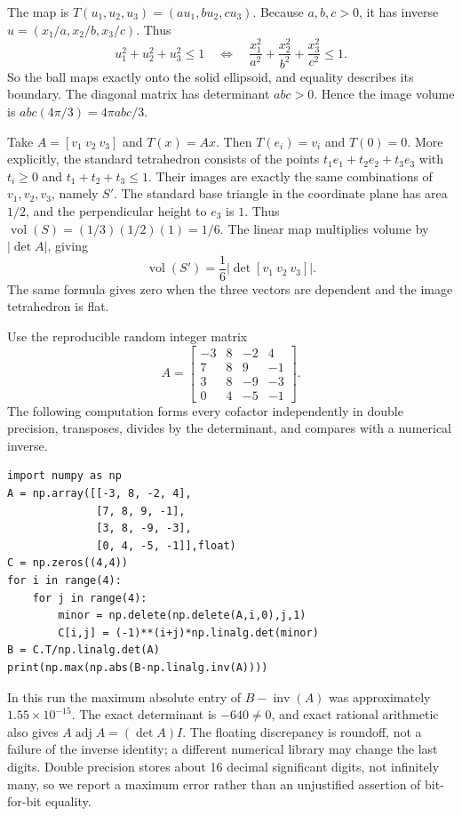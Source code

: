 The map is $T(u_1,u_2,u_3)=(au_1,bu_2,cu_3)$. Because $a,b,c>0$, it has inverse $u=(x_1/a,x_2/b,x_3/c)$. Thus
\[
u_1^2+u_2^2+u_3^2\le1
\quad\Longleftrightarrow\quad
\frac{x_1^2}{a^2}+\frac{x_2^2}{b^2}+\frac{x_3^2}{c^2}\le1.
\]
So the ball maps exactly onto the solid ellipsoid, and equality describes its boundary.
The diagonal matrix has determinant $abc>0$. Hence the image volume is $abc(4\pi/3)=4\pi abc/3$.

Take $A=[v_1\ v_2\ v_3]$ and $T(x)=Ax$. Then $T(e_i)=v_i$ and $T(0)=0$. More explicitly, the standard tetrahedron consists of the points $t_1e_1+t_2e_2+t_3e_3$ with $t_i\ge0$ and $t_1+t_2+t_3\le1$. Their images are exactly the same combinations of $v_1,v_2,v_3$, namely $S'$.
The standard base triangle in the coordinate plane has area $1/2$, and the perpendicular height to $e_3$ is $1$. Thus $\operatorname{vol}(S)=(1/3)(1/2)(1)=1/6$. The linear map multiplies volume by $|\det A|$, giving
\[
\operatorname{vol}(S')=\frac16\big|\det[v_1\ v_2\ v_3]\big|.
\]
The same formula gives zero when the three vectors are dependent and the image tetrahedron is flat.

Use the reproducible random integer matrix
\[A=\begin{bmatrix}-3&8&-2&4\\7&8&9&-1\\3&8&-9&-3\\0&4&-5&-1\end{bmatrix}.\]
The following computation forms every cofactor independently in double precision, transposes, divides by the determinant, and compares with a numerical inverse.
\begin{verbatim}
import numpy as np
A = np.array([[-3, 8, -2, 4],
              [7, 8, 9, -1],
              [3, 8, -9, -3],
              [0, 4, -5, -1]],float)
C = np.zeros((4,4))
for i in range(4):
    for j in range(4):
        minor = np.delete(np.delete(A,i,0),j,1)
        C[i,j] = (-1)**(i+j)*np.linalg.det(minor)
B = C.T/np.linalg.det(A)
print(np.max(np.abs(B-np.linalg.inv(A))))
\end{verbatim}
In this run the maximum absolute entry of $B-\operatorname{inv}(A)$ was approximately $1.55\times10^{-15}$. The exact determinant is $-640\ne0$, and exact rational arithmetic also gives $A\operatorname{adj}A=(\det A)I$.
The floating discrepancy is roundoff, not a failure of the inverse identity; a different numerical library may change the last digits. Double precision stores about 16 decimal significant digits, not infinitely many, so we report a maximum error rather than an unjustified assertion of bit-for-bit equality.

